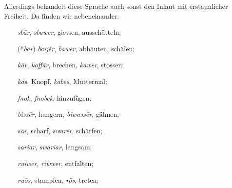Allerdings behandelt diese Sprache auch sonst den Inlaut mit erstaunlicher Freiheit. Da finden wir nebeneinander:

~~~~\textit{sbār}, \textit{sbawer}, giessen, ausschütteln;

~~~~(*\textit{bār}) \textit{baijĕr}, \textit{bawer}, abhäuten, schälen; 

~~~~\textit{kār}, \textit{koffār}, brechen, \textit{kawer}, stossen;

~~~~\textit{kās}, Knopf, \textit{kabes}, Muttermal;

~~~~\textit{fnok}, \textit{fnobek}, hinzufügen;

~~~~\textit{bissēr}, hungern, \textit{biwassēr}, gähnen;

~~~~\textit{sār}, scharf, \textit{swarēr}, schärfen;

~~~~\textit{sariar}, \textit{swariar}, langsam;

~~~~\textit{ruiwēr}, \textit{riwwer}, entfalten;

~~~~\textit{ruōs}, stampfen, \textit{rōs}, treten;

